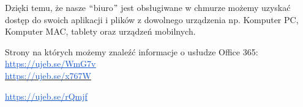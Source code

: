 \documentclass[12pt]{article}
\renewcommand{\_}{\kern-1.5pt\textunderscore\kern-1.5pt}
\begin{document}
\begin{adjustwidth}{0.5in}{0.0in}
Dzięki temu, że nasze $``$biuro$"$  jest obsługiwane w chmurze możemy uzyskać dostęp do swoich aplikacji i plików z dowolnego urządzenia np. Komputer PC, Komputer MAC, tablety oraz urządzeń mobilnych.\par

\end{adjustwidth}

\begin{adjustwidth}{0.5in}{0.0in}
Strony na których możemy znaleźć informacje o usłudze Office 365:\\
\href{https://ujeb.se/WmG7v}{\textcolor[HTML]{1155CC}{\ul{https://ujeb.se/WmG7v}\\
\href{https://ujeb.se/x767W}{https://ujeb.se/x767W}}}\par

\end{adjustwidth}

\begin{adjustwidth}{0.5in}{0.0in}
\href{https://ujeb.se/rQmjf}{\textcolor[HTML]{1155CC}{\ul{https://ujeb.se/rQmjf}}} \\
\par

\end{adjustwidth}
\end{document}
